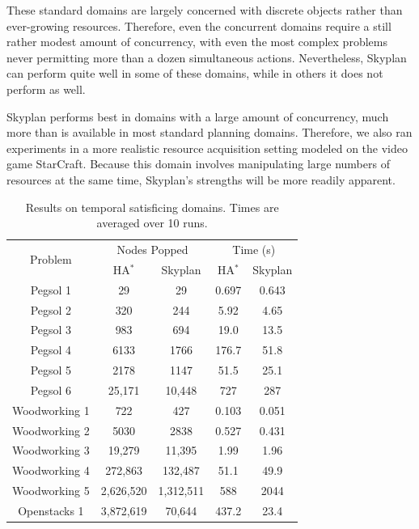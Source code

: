 \documentclass[letterpaper]{article}
\theoremstyle{plain} \newtheorem{theorem}{Theorem} \newtheorem{proposition}{Proposition} \newtheorem{lemma}{Lemma}
\theoremstyle{definition} \newtheorem{definition}{Definition} \newtheorem{conjecture}{Conjecture} \newtheorem*{example}{Example}
\theoremstyle{remark} \newtheorem*{remark}{Remark} \newtheorem*{note}{Note} \newtheorem{case}{Case}
\newcommand{\HAstar}{HA$^*$ }
\begin{document}
These standard domains are largely concerned with discrete objects
rather than ever-growing resources. Therefore, even the concurrent domains
require a still rather modest amount of concurrency, with even the most complex
problems never permitting more than a dozen simultaneous actions. Nevertheless, Skyplan can perform quite well in some of these domains, while in others it does not perform as well.

Skyplan performs best in domains with a large amount of concurrency, much more
than is available in most standard planning domains. Therefore, we also ran
experiments in a more realistic resource acquisition setting modeled on the
video game StarCraft. Because this domain involves manipulating large numbers
of resources at the same time, Skyplan's strengths will be more readily
apparent.


\begin{table}[t!]
  \footnotesize
	\begin{center}
		\begin{tabular}{|c|cc|cc|}
			\hline
			\multirow{2}{*}{Problem} & \multicolumn{2}{c|}{Nodes Popped} & \multicolumn{2}{c|}{Time (s)} \\
			& \HAstar & Skyplan & \HAstar & Skyplan \\
			\hline
			Pegsol 1 & 29 & 29 & 0.697 & 0.643 \\
			Pegsol 2 & 320 & 244 & 5.92 & 4.65 \\
			Pegsol 3 & 983 & 694 & 19.0 & 13.5 \\
			Pegsol 4 & 6133 & 1766 & 176.7 & 51.8 \\
			Pegsol 5 & 2178 & 1147 & 51.5 & 25.1 \\
			Pegsol 6 & 25,171 & 10,448 & 727 & 287 \\
			\hline
			Woodworking 1 & 722 & 427 & 0.103 & 0.051 \\
			Woodworking 2 & 5030 & 2838 & 0.527 & 0.431 \\
			Woodworking 3 & 19,279 & 11,395 & 1.99 & 1.96 \\
			Woodworking 4 & 272,863 & 132,487 & 51.1 & 49.9 \\
			Woodworking 5 & 2,626,520 & 1,312,511 & 588 & 2044 \\
			\hline
			Openstacks 1 & 3,872,619 & 70,644 & 437.2 & 23.4 \\
			\hline
		\end{tabular}
	\end{center}
  \vspace{-.15in}
	\caption{Results on temporal satisficing domains. Times are averaged over 10 runs.}
	\label{tab:tempo-sat}
  \vspace{-.24in}
\end{table}
\end{document}

